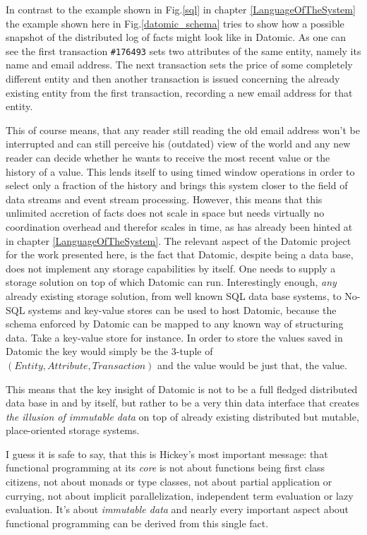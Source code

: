 In contrast to the example shown in Fig.\ref{sql} in
chapter \ref{LanguageOfTheSystem} the example shown here in
Fig.\ref{datomic_schema} tries to show how a possible snapshot of
the distributed log of facts might look like in Datomic. As one
can see the first transaction \texttt{\#176493} sets two attributes of
the same entity, namely its name and email address. The next
transaction sets the price of some completely different entity
and then another transaction is issued concerning the already
existing entity from the first transaction, recording a new email
address for that entity.

This of course means, that any reader still reading the old
email address won't be interrupted and can still perceive his
(outdated) view of the world and any new reader can decide whether
he wants to receive the most recent value or the history of a
value. This lends itself to using timed window operations in order
to select only a fraction of the history and brings this system
closer to the field of data streams and event stream processing.
However, this means that this unlimited accretion of facts does not
scale in space but needs virtually no coordination overhead and
therefor scales in time, as has already been hinted at in chapter
\ref{LanguageOfTheSystem}.
\newline
The relevant aspect of the Datomic project for the work presented
here, is the fact that Datomic, despite being a data base, does not
implement any storage capabilities by itself. One needs to supply a storage
solution on top of which Datomic can run. Interestingly enough,
\textit{any} already existing storage solution, from well known
SQL data base systems, to No-SQL systems and key-value stores can
be used to host Datomic, because the schema enforced by Datomic
can be mapped to any known way of structuring data. Take a key-value
store for instance. In order to store the values saved in Datomic
the key would simply be the 3-tuple of $(Entity, Attribute, Transaction)$
and the value would be just that, the value.

This means that the key insight of Datomic is not to be a full fledged
distributed data base in and by itself, but rather to be a very
thin data interface that creates \textit{the illusion of immutable data}
on top of already existing distributed but mutable,
place-oriented storage systems.
\newline

I guess it is safe to say, that this is Hickey's most important
message: that functional programming at its \textit{core} is not
about functions being first class citizens, not about monads or
type classes, not about partial application or currying, not
about implicit parallelization, independent term evaluation or
lazy evaluation.
It's about \textit{immutable data} and nearly every important aspect about
functional programming can be derived from this single fact.

